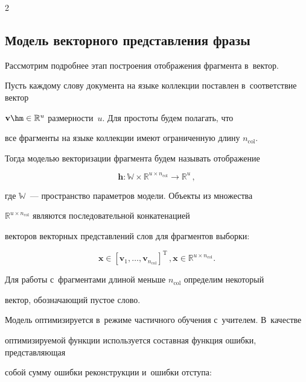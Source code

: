 \begin{multicols}{2}
\subsection{Модель векторного представления фразы}





Рассмотрим подробнее этап построения отображения фрагмента в~вектор.


Пусть каждому слову документа на языке коллекции поставлен в~соответствие вектор 


$\mathbf{v} \hm\in \mathbb{R}^u$ размерности~$u$. Для прос\-то\-ты будем полагать, что 


все фрагменты на языке коллекции имеют ограниченную длину $n_{\mathrm{col}}$.


Тогда моделью векторизации фрагмента будем называть отображение


$$


    \mathbf{h}: \mathbb{W} \times \mathbb{R}^{u \times n_{\mathrm{col}}} \to 


\mathbb{R}^u\,,


$$


где $\mathbb{W}$~--- пространство параметров модели. Объекты из множества 


$\mathbb{R}^{u \times n_{\mathrm{col}}}$ являются последовательной конкатенацией 


векторов векторных представлений слов для фрагментов выборки:


$$


\mathbf{x} \in [\mathbf{v}_1, \dots, \mathbf{v}_{n_{\mathrm{col}}}]^{\mathrm{T}}\,,  


\mathbf{x} \in \mathbb{R}^{u \times n_{\mathrm{col}}}.


$$


Для работы с~фрагментами длиной меньше $n_{\mathrm{col}}$ определим некоторый 


вектор, обозначающий пус\-тое слово.








Модель оптимизируется в~режиме частичного обучения с~учителем. В~качестве 


оптимизируемой функции используется составная функция ошибки, представляющая 


собой сумму ошибки реконструкции и~ошибки отступа:


\begin{equation}



\end{equation}
\end{multicols}
